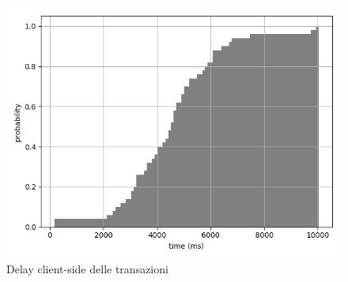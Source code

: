 \begin{figure}[h!t]
\centerline{\includegraphics[width=\textwidth]{img/client-side-delay-grey}}
\caption{Delay client-side delle transazioni}
\label{f:calcoli:client}
\end{figure}